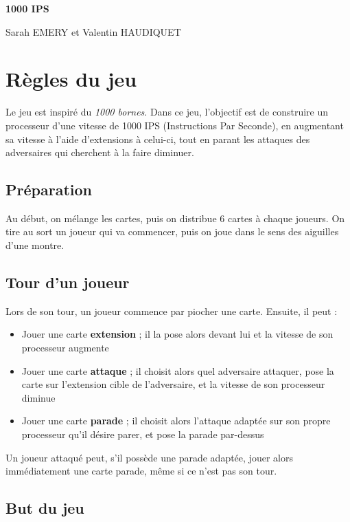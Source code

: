 \documentclass[12pt, a4paper, dvipsnames]{article}
\begin{document}
\begin{center}
    \huge \textbf{1000 IPS}
\end{center}

\begin{center}
	\large {Sarah EMERY et Valentin HAUDIQUET}
\end{center}

\section{Règles du jeu}

Le jeu est inspiré du \textit{1000 bornes}. Dans ce jeu, l'objectif est de construire un processeur d'une vitesse de 1000 IPS (Instructions Par Seconde), en augmentant sa vitesse à l'aide d'extensions à celui-ci, tout en parant les attaques des adversaires qui cherchent à la faire diminuer.

\subsection{Préparation}

Au début, on mélange les cartes, puis on distribue 6 cartes à chaque joueurs.
On tire au sort un joueur qui va commencer, puis on joue dans le sens des aiguilles d'une montre.

\subsection{Tour d'un joueur}

Lors de son tour, un joueur commence par piocher une carte.
Ensuite, il peut :
\begin{itemize}
    \item Jouer une carte \textbf{extension} ; il la pose alors devant lui et la vitesse de son processeur augmente
    \item Jouer une carte \textbf{attaque} ; il choisit alors quel adversaire attaquer, pose la carte sur l'extension cible de l'adversaire, et la vitesse de son processeur diminue
    \item Jouer une carte \textbf{parade} ; il choisit alors l'attaque adaptée sur son propre processeur qu'il désire parer, et pose la parade par-dessus
\end{itemize}

Un joueur attaqué peut, s'il possède une parade adaptée, jouer alors immédiatement une carte parade, même si ce n'est pas son tour.

\subsection{But du jeu}
\end{document}
